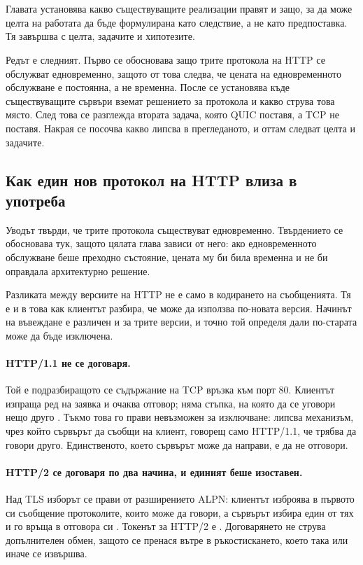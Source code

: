 \section{}

Главата установява какво съществуващите реализации правят и защо, за да може целта на
работата да бъде формулирана като следствие, а не като предпоставка. Тя завършва с целта,
задачите и хипотезите.

Редът е следният. Първо се обосновава защо трите протокола на HTTP се обслужват едновременно,
защото от това следва, че цената на едновременното обслужване е постоянна, а не временна.
После се установява къде съществуващите сървъри вземат решението за протокола и какво струва
това място. След това се разглежда втората задача, която QUIC поставя, а TCP не поставя.
Накрая се посочва какво липсва в прегледаното, и оттам следват целта и задачите.

\subsection{Как един нов протокол на HTTP влиза в употреба}
\label{sec:coexistence}

Уводът твърди, че трите протокола съществуват едновременно. Твърдението се обосновава тук,
защото цялата глава зависи от него: ако едновременното обслужване беше преходно състояние,
цената му би била временна и не би оправдала архитектурно решение.

Разликата между версиите на HTTP не е само в кодирането на съобщенията. Тя е и в това как
клиентът разбира, че може да използва по-новата версия. Начинът на въвеждане е различен и за
трите версии, и точно той определя дали по-старата може да бъде изключена.

\paragraph{HTTP/1.1 не се договаря.} Той е подразбиращото се съдържание на TCP връзка към
порт 80. Клиентът изпраща ред на заявка и очаква отговор; няма стъпка, на която да се уговори
нещо друго \cite{rfc9112}. Тъкмо това го прави невъзможен за изключване: липсва механизъм,
чрез който сървърът да съобщи на клиент, говорещ само HTTP/1.1, че трябва да говори друго.
Единственото, което сървърът може да направи, е да не отговори.

\paragraph{HTTP/2 се договаря по два начина, и единият беше изоставен.} Над TLS изборът се
прави от разширението ALPN: клиентът изброява в първото си съобщение протоколите, които може
да говори, а сървърът избира един от тях и го връща в отговора си \cite{rfc7301}. Токенът за
HTTP/2 е  \cite{rfc7540}. Договарянето не струва допълнителен обмен, защото се
пренася вътре в ръкостискането, което така или иначе се извършва.

